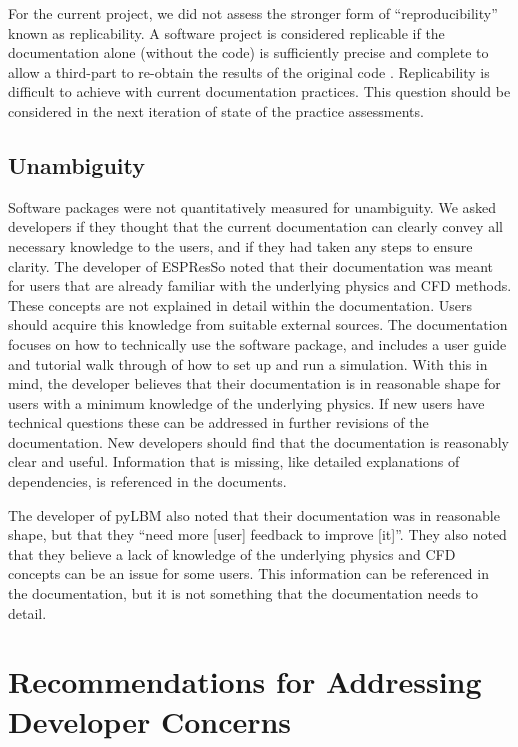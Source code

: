 \documentclass[final, 3p, times, authoryear]{elsarticle}
\begin{document}
For the current project, we did not assess the stronger form of
``reproducibility'' known as replicability.  A software project is considered
replicable if the documentation alone (without the code) is sufficiently precise
and complete to allow a third-part to re-obtain the results of the original code
\citep{BenureauAndRougier2017}.  Replicability is difficult to achieve with
current documentation practices.  This question should be considered in the next
iteration of state of the practice assessments. 

\subsection{Unambiguity}

Software packages were not quantitatively measured for unambiguity. We asked
developers if they thought that the current documentation can clearly convey all
necessary knowledge to the users, and if they had taken any steps to ensure
clarity. The developer of ESPResSo noted that their documentation was meant for
users that are already familiar with the underlying physics and CFD methods.
These concepts are not explained in detail within the documentation. Users
should acquire this knowledge from suitable external sources. The documentation
focuses on how to technically use the software package, and includes a user
guide and tutorial walk through of how to set up and run a simulation. With this
in mind, the developer believes that their documentation is in reasonable shape
for users with a minimum knowledge of the underlying physics. If new users have
technical questions these can be addressed in further revisions of the
documentation. New developers should find that the documentation is reasonably
clear and useful. Information that is missing, like detailed explanations of
dependencies, is referenced in the documents. 

The developer of pyLBM also noted that their documentation was in reasonable
shape, but that they ``need more [user] feedback to improve [it]''. They also
noted that they believe a lack of knowledge of the underlying physics and CFD
concepts can be an issue for some users. This information can be referenced in
the documentation, but it is not something that the documentation needs to
detail. 

\section{Recommendations for Addressing Developer Concerns} \label{Sec_AddressConcerns}
\end{document}
